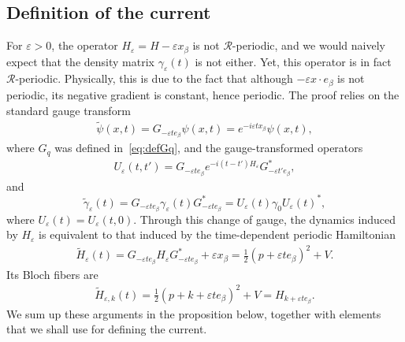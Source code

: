 \documentclass[a4paper,11pt]{article}
\theoremstyle{plain}
\theoremstyle{remark}
\def\eps{{\varepsilon}}
\def\cR{{\mathcal R}}
\begin{document}
\subsection{Definition of the current}
For $\eps>0$, the operator $H_\eps=H-\eps x_\beta$ is not
$\cR$-periodic, and we would naively expect that the density matrix
$\gamma_\eps(t)$ is not either. Yet, this operator is in fact
$\cR$-periodic. Physically, this is due to the fact that although
$-\eps x\cdot e_\beta$ is not periodic, its negative gradient is constant,
hence periodic. The proof relies on the standard gauge transform
\begin{align}\label{eq:gauge_change}
\widetilde\psi(x,t)=G_{-\eps t e_\beta}\psi(x,t)
=e^{-i\eps t x_\beta}\psi(x,t),
\end{align}
where $G_q$ was defined in~\eqref{eq:defGq}, and the gauge-transformed operators
\begin{align}\label{gauge_u}
U_\eps(t,t')=G_{-\eps t e_\beta}
 e^{-i(t-t')H_\eps}G_{-\eps t'e_\beta}^*,
\end{align}
and
\begin{equation}\label{gauge}
\widetilde\gamma_\eps(t)=G_{-\eps t e_\beta}\gamma_\eps(t)G_{-\eps t e_\beta}^*
=U_\eps(t)\gamma_0U_\eps(t)^*,
\end{equation}
where $U_\eps(t)=U_\eps(t,0)$. Through this change of gauge, the dynamics
induced by $H_\eps$ is equivalent to that induced by the time-dependent
periodic Hamiltonian
\begin{align}\label{widetilde_H}
\widetilde H_\eps(t)=G_{-\eps t e_\beta}H_\eps G_{-\eps t e_\beta}^*
+\eps x_\beta=\frac12(p+\eps t e_\beta)^2+V.
\end{align}
Its Bloch fibers are
\begin{align}\label{widetilde_H_k}
\widetilde H_{\eps,k}(t)=\frac12(p+k+\eps t e_\beta)^2+V=H_{k+\eps t e_\beta}.
\end{align}
We sum up these arguments in the proposition below, together with elements
that we shall use for defining the current.
\end{document}
